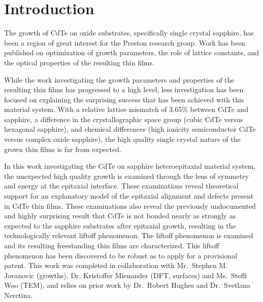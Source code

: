 \section{Introduction}
The growth of CdTe on oxide substrates, specifically single crystal sapphire, has been a region of great interest for the Preston research group.
Work has been published on optimization of growth parameters, the role of lattice constants, and the optical properties of the resulting thin films\cite{Neretina2009a,Neretina2008b,Neretina2009b,Neretina2007,Neretina2006,cdte-optical}.

While the work investigating the growth parameters and properties of the resulting thin films has progressed to a high level, less investigation has been focused on explaining the surprising success that has been achieved with this material system.
With a relative lattice mismatch of 3.65\% between CdTe and sapphire, a difference in the 
crystallographic space group (cubic CdTe versus hexagonal sapphire), and chemical differences (high ionicity semiconductor CdTe versus complex oxide sapphire), the high quality single crystal nature of the grown thin films is far from expected.

In this work investigating the CdTe on sapphire heteroepitaxial material system, the unexpected high quality growth is examined through the lens of symmetry and energy at the epitaxial interface.
These examinations reveal theoretical support for an explanatory model of the epitaxial alignment and defects present in CdTe thin films.
These examinations also reveal the previously undocumented and highly surprising result that CdTe is not bonded nearly as strongly as expected to the sapphire substrates after epitaxial growth, resulting in the technologically relevant liftoff phenomenon.
The liftoff phenomenon is examined and its resulting freestanding thin films are characterized.
This liftoff phenomenon has been discovered to be robust as to apply for a provisional patent\cite{patent}.
This work was completed in collaboration with Mr.~Stephen M. Jovanovic (growths), Dr.
Kristoffer Mienander (DFT, surfaces) and Ms.~Steffi Woo (TEM), and relies on prior work by Dr.~Robert Hughes and Dr.~Svetlana Neretina.


